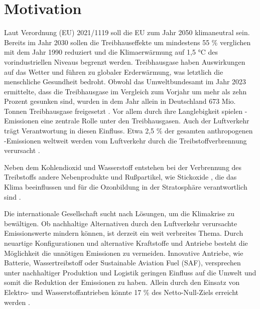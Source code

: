 \chapter{Motivation}
\label{ch:Einleitung}

Laut Verordnung (EU) 2021/1119 soll die EU zum Jahr 2050 klimaneutral sein. Bereits im Jahr 2030 sollen die Treibhauseffekte um mindestens 55 \%
verglichen mit dem Jahr 1990 reduziert und die Klimaerwärmung auf 1,5 °C des vorindustriellen Niveaus begrenzt werden.
Treibhausgase haben Auswirkungen auf das Wetter und führen zu globaler Erderwärmung, was letztlich die menschliche Gesundheit bedroht. %
Obwohl das Umweltbundesamt im Jahr 2023 ermittelte, dass die Treibhausgase im Vergleich zum Vorjahr um mehr als zehn Prozent gesunken sind, 
wurden in dem Jahr allein in Deutschland 673 Mio. Tonnen Treibhausgase freigesetzt \cite{bundesregierung}.
Vor allem durch ihre Langlebigkeit \cite{filonchyk2024greenhouse} spielen -Emissionen eine zentrale Rolle unter den Treibhausgasen. 
Auch der Luftverkehr trägt Verantwortung in diesen Einfluss. 
Etwa 2,5 \% der gesamten anthropogenen -Emissionen weltweit werden vom Luftverkehr
durch die Treibstoffverbrennung verursacht \cite{conrady2019luftverkehr}. 

Neben dem Kohlendioxid  und Wasserstoff  entstehen bei der Verbrennung des Treibstoffs andere Nebenprodukte und Rußpartikel, wie Stickoxide ,
die das Klima beeinflussen und für die Ozonbildung in der Stratosphäre verantwortlich sind \cite{conrady2019luftverkehr}.

Die internationale Gesellschaft sucht nach Lösungen, um die Klimakrise zu bewältigen. 
Ob nachhaltige Alternativen durch den Luftverkehr verursachte Emissionswerte mindern können, ist derzeit ein weit verbreites Thema.
Durch neuartige Konfigurationen und alternative Kraftstoffe und Antriebe besteht die Möglichkeit die unnötigen Emissionen zu vermeiden.
Innovative Antriebe, wie Batterie, Wassertreibstoff oder Sustainable Aviation Fuel (SAF), versprechen unter nachhaltiger Produktion und
Logistik geringen Einfluss auf die Umwelt und somit die Reduktion der Emissionen zu haben.
Allein durch den Einsatz von Elektro- und Wasserstoffantrieben könnte 17 \% des Netto-Null-Ziels erreicht werden \cite{gao2022hydrogen}.
%

